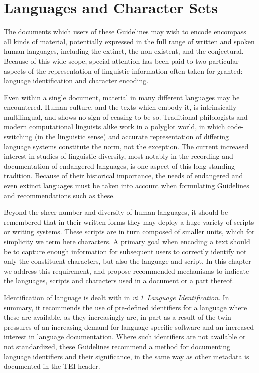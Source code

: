
\section[{Languages and Character Sets}]{Languages and Character Sets}\label{CH}\par
The documents which users of these Guidelines may wish to encode encompass all kinds of material, potentially expressed in the full range of written and spoken human languages, including the extinct, the non-existent, and the conjectural. Because of this wide scope, special attention has been paid to two particular aspects of the representation of linguistic information often taken for granted: language identification and character encoding.\par
Even within a single document, material in many different languages may be encountered. Human culture, and the texts which embody it, is intrinsically multilingual, and shows no sign of ceasing to be so. Traditional philologists and modern computational linguists alike work in a polyglot world, in which code-switching (in the linguistic sense) and accurate representation of differing language systems constitute the norm, not the exception. The current increased interest in studies of linguistic diversity, most notably in the recording and documentation of endangered languages, is one aspect of this long standing tradition. Because of their historical importance, the needs of endangered and even extinct languages must be taken into account when formulating Guidelines and recommendations such as these. \par
Beyond the sheer number and diversity of human languages, it should be remembered that in their written forms they may deploy a huge variety of scripts or writing systems. These scripts are in turn composed of smaller units, which for simplicity we term here characters. A primary goal when encoding a text should be to capture enough information for subsequent users to correctly identify not only the constituent characters, but also the language and script. In this chapter we address this requirement, and propose recommended mechanisms to indicate the languages, scripts and characters used in a document or a part thereof. \par
Identification of language is dealt with in \textit{\hyperref[CHSH]{vi.1\ Language Identification}}. In summary, it recommends the use of pre-defined identifiers for a language where these are available, as they increasingly are, in part as a result of the twin pressures of an increasing demand for language-specific software and an increased interest in language documentation. Where such identifiers are not available or not standardized, these Guidelines recommend a method for documenting language identifiers and their significance, in the same way as other metadata is documented in the TEI header.\par
